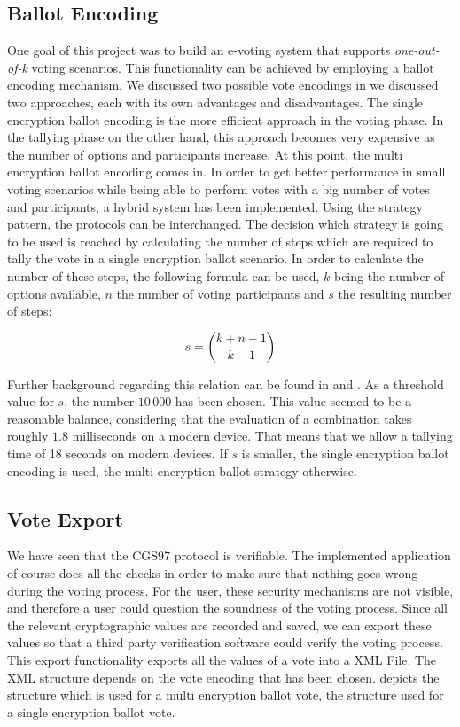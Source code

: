 \documentclass[numbers=noenddot, abstract=on, a4paper, headsepline,
footsepline, oneside, openright, draft=off, listof=leveldown]{scrreprt}
\begin{document}
\subsection{Ballot Encoding}
One goal of this project was to build an e-voting system that supports
\emph{one-out-of-k} voting scenarios. This functionality can be achieved by
employing a ballot encoding mechanism. We discussed two possible vote encodings
in  we discussed two approaches, each with its own
advantages and disadvantages. The single encryption ballot encoding is the more
efficient approach in the voting phase. In the tallying phase on the other hand,
this approach becomes very expensive as the number of options and participants
increase. At this point, the multi encryption ballot encoding comes in. In order
to get better performance in small voting scenarios while being able to perform
votes with a big number of votes and participants, a hybrid system has been
implemented. Using the strategy pattern, the protocols can be interchanged. The
decision which strategy is going to be used is reached by calculating the number
of steps which are required to tally the vote in a single encryption ballot
scenario. In order to calculate the number of these steps, the following formula
can be used, $k$ being the number of options available, $n$ the number of
voting participants and $s$ the resulting number of steps:

\begin{equation}
s = \dbinom{k+n-1}{k-1} \notag
\end{equation}

Further background regarding this relation can be found in \cite{vonBergen14}
and \cite{HRZ10}.
As a threshold value for $s$, the number $10\,000$ has been chosen. This value
seemed to be a reasonable balance, considering that the evaluation of a combination takes
roughly $1.8$ milliseconds on a modern device. That means that we allow a
tallying time of 18 seconds on modern devices. If $s$ is smaller, the single
encryption ballot encoding is used, the multi encryption ballot strategy otherwise.

\subsection{Vote Export}
We have seen that the CGS97 protocol is verifiable. The implemented application
of course does all the checks in order to make sure that nothing goes wrong
during the voting process. For the user, these security mechanisms are not
visible, and therefore a user could question the soundness of the voting
process. Since all the relevant cryptographic values are recorded and saved, we
can export these values so that a third party verification software could verify
the voting process. This export functionality exports all the values of a vote
into a XML File. The XML structure depends on the vote encoding that has been
chosen.  depicts the structure which is used for a
multi encryption ballot vote,  the structure used
for a single encryption ballot vote.
\end{document}
